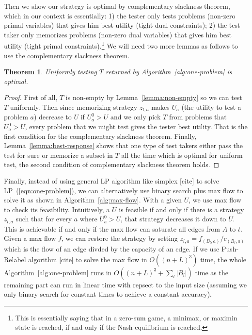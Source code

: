 \documentclass{article}
\newtheorem{theorem}{Theorem}
\begin{document}
Then we show our strategy is optimal by complementary slackness theorem, which
in our context is essentially: 1) the tester only tests problems (non-zero
primal variables) that gives him best utility (tight dual constraints); 2) the
test taker only memorizes problems (non-zero dual variables) that gives him
best utility (tight primal constraints).\footnote{This is essentially saying
that in a zero-sum game, a minimax, or maximin state is reached, if and only if
the Nash equilibrium is reached.} We will need two more lemmas as follows to
use the complementary slackness theorem.

\begin{theorem}
Uniformly testing $T$ returned by Algorithm~\ref{alg:one-problem} is optimal.
\end{theorem}
\begin{proof}
First of all, $T$ is non-empty by Lemma~\ref{lemma:non-empty} so we can test
$T$ uniformly. Then since memorizing strategy $z_{l,a}$ makes $U_a$ (the
utility to test a problem $a$) decrease to $U$ if $U^0_a > U$ and we only pick
$T$ from problems that $U^0_a > U$, every problem that we might test gives the
tester best utility. That is the first condition for the complementary
slackness theorem.  Finally, Lemma~\ref{lemma:best-response} shows that one
type of test takers either pass the test for sure or memorize a subset in $T$
all the time which is optimal for uniform test, the second condition of
complementary slackness theorem holds.
\end{proof}

Finally, instead of using general LP algorithm like simplex [cite] to solve
LP~(\ref{eqn:one-problem}), we can alternatively use binary search plus max
flow to solve it as shown in Algorithm~\ref{alg:max-flow}.  With a given $U$,
we use max flow to check its feasibility. Intuitively, a $U$ is feasible if and
only if there is a strategy $z_{l, a}$ such that for every $a$ where $U^0_a >
U$, that strategy decreases it down to $U$. This is achievable if and only if
the max flow can saturate all edges from $A$ to $t$. Given a max flow $f$, we
can restore the strategy by setting $z_{l, a} = f_{(B_l, a)}/c_{(B_l, a)}$
which is the flow of an edge divded by the capacity of an edge. If we use
Push-Relabel algorithm [cite] to solve the max flow in $O((n+L)^3)$ time, the
whole Algorithm~\ref{alg:one-problem} runs in $O((n+L)^3 + \sum_l |B_l|)$ time
as the remaining part can run in linear time with repsect to the input size
(assuming we only binary search for constant times to achieve a constant
accuracy).
\end{document}
